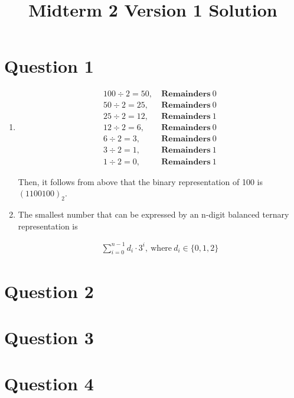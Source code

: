 \documentclass[12pt]{article}
\begin{document}
\title{Midterm 2 Version 1 Solution}
\maketitle

\section*{Question 1}
\begin{enumerate}
    \item

    \begin{align*}
        100 \div 2 = 50,\:&\textbf{Remainders}\:0\\
        50 \div 2 = 25,\:&\textbf{Remainders}\:0\\
        25 \div 2 = 12,\:&\textbf{Remainders}\:1\\
        12 \div 2 = 6,\:&\textbf{Remainders}\:0\\
        6 \div 2 = 3,\:&\textbf{Remainders}\:0\\
        3 \div 2 = 1,\:&\textbf{Remainders}\:1\\
        1 \div 2 = 0,\:&\textbf{Remainders}\:1
    \end{align*}

    \bigskip

    Then, it follows from above that the binary representation of 100 is $(1100100)_2$.

    \item

    The smallest number that can be expressed by an n-digit balanced ternary
    representation is

    \begin{align}
        \sum\limits_{i=0}^{n-1} d_i \cdot 3^i,\:\text{where}\:d_i \in \{0,1,2\}
    \end{align}
\end{enumerate}

\section*{Question 2}

\section*{Question 3}

\section*{Question 4}
\end{document}
